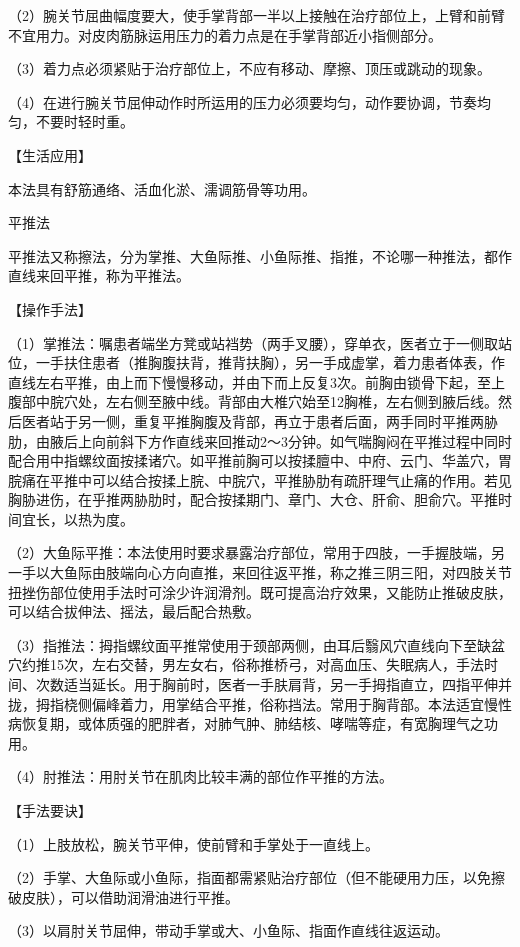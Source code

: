 \documentclass[12pt,UTF8]{ctexbook}
\begin{document}
（2）腕关节屈曲幅度要大，使手掌背部一半以上接触在治疗部位上，上臂和前臂不宜用力。对皮肉筋脉运用压力的着力点是在手掌背部近小指侧部分。

（3）着力点必须紧贴于治疗部位上，不应有移动、摩擦、顶压或跳动的现象。

（4）在进行腕关节屈伸动作时所运用的压力必须要均匀，动作要协调，节奏均匀，不要时轻时重。

【生活应用】

本法具有舒筋通络、活血化淤、濡调筋骨等功用。

平推法

平推法又称擦法，分为掌推、大鱼际推、小鱼际推、指推，不论哪一种推法，都作直线来回平推，称为平推法。

【操作手法】

（1）掌推法：嘱患者端坐方凳或站裆势（两手叉腰），穿单衣，医者立于一侧取站位，一手扶住患者（推胸腹扶背，推背扶胸），另一手成虚掌，着力患者体表，作直线左右平推，由上而下慢慢移动，并由下而上反复3次。前胸由锁骨下起，至上腹部中脘穴处，左右侧至腋中线。背部由大椎穴始至12胸椎，左右侧到腋后线。然后医者站于另一侧，重复平推胸腹及背部，再立于患者后面，两手同时平推两胁肋，由腋后上向前斜下方作直线来回推动2～3分钟。如气喘胸闷在平推过程中同时配合用中指螺纹面按揉诸穴。如平推前胸可以按揉膻中、中府、云门、华盖穴，胃脘痛在平推中可以结合按揉上脘、中脘穴，平推胁肋有疏肝理气止痛的作用。若见胸胁进伤，在乎推两胁肋时，配合按揉期门、章门、大仓、肝俞、胆俞穴。平推时间宜长，以热为度。

（2）大鱼际平推：本法使用时要求暴露治疗部位，常用于四肢，一手握肢端，另一手以大鱼际由肢端向心方向直推，来回往返平推，称之推三阴三阳，对四肢关节扭挫伤部位使用手法时可涂少许润滑剂。既可提高治疗效果，又能防止推破皮肤，可以结合拔伸法、摇法，最后配合热敷。

（3）指推法：拇指螺纹面平推常使用于颈部两侧，由耳后翳风穴直线向下至缺盆穴约推15次，左右交替，男左女右，俗称推桥弓，对高血压、失眠病人，手法时间、次数适当延长。用于胸前时，医者一手肤肩背，另一手拇指直立，四指平伸并拢，拇指桡侧偏峰着力，用掌结合平推，俗称挡法。常用于胸背部。本法适宜慢性病恢复期，或体质强的肥胖者，对肺气肿、肺结核、哮喘等症，有宽胸理气之功用。

（4）肘推法：用肘关节在肌肉比较丰满的部位作平推的方法。

【手法要诀】

（1）上肢放松，腕关节平伸，使前臂和手掌处于一直线上。

（2）手掌、大鱼际或小鱼际，指面都需紧贴治疗部位（但不能硬用力压，以免擦破皮肤），可以借助润滑油进行平推。

（3）以肩肘关节屈伸，带动手掌或大、小鱼际、指面作直线往返运动。
\end{document}
